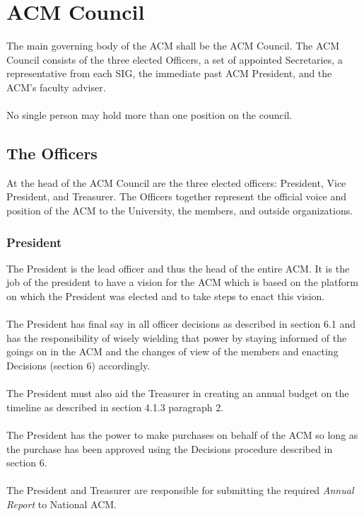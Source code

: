 \documentclass[12pt,titlepage]{article}
\begin{document}
\section{ACM Council}

The main governing body of the ACM shall be the ACM Council. The ACM Council consists of the three elected Officers, a set of appointed Secretaries, a representative from each SIG, the immediate past ACM President, and the ACM's faculty adviser.\\
\\
No single person may hold more than one position on the council.

\subsection{The Officers}

At the head of the ACM Council are the three elected officers: President, Vice President, and Treasurer. The Officers together represent the official voice and position of the ACM to the University, the members, and outside organizations.

\subsubsection{President}

The President is the lead officer and thus the head of the entire ACM. It is the job of the president to have a vision for the ACM which is based on the platform on which the President was elected and to take steps to enact this vision.\\
\\
The President has final say in all officer decisions as described in section 6.1 and has the responsibility of wisely wielding that power by staying informed of the goings on in the ACM and the changes of view of the members and enacting Decisions (section 6) accordingly.\\
\\
The President must also aid the Treasurer in creating an annual budget on the timeline as described in section 4.1.3 paragraph 2.\\
\\
The President has the power to make purchases on behalf of the ACM so long as the purchase has been approved using the Decisions procedure described in section 6.\\
\\
The President and Treasurer are responsible for submitting the required \emph{Annual Report} to National ACM.
\end{document}

